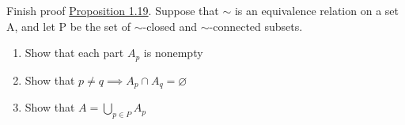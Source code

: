 
Finish proof \href{doc/1 math/Seven Sketches in Compositionality/1 Generative Effects/2 What is order/Partitions are equivalences}{Proposition 1.19}. Suppose that $\sim$ is an equivalence relation on a set A, and let P be the set of $\sim$-closed and $\sim$-connected subsets.
\begin{enumerate}
  \item Show that each part $A_p$ is nonempty
  \item Show that $p \ne q \implies A_p \cap A_q = \varnothing$
  \item Show that $A = \bigcup_{p \in P} A_p$
\end{enumerate}